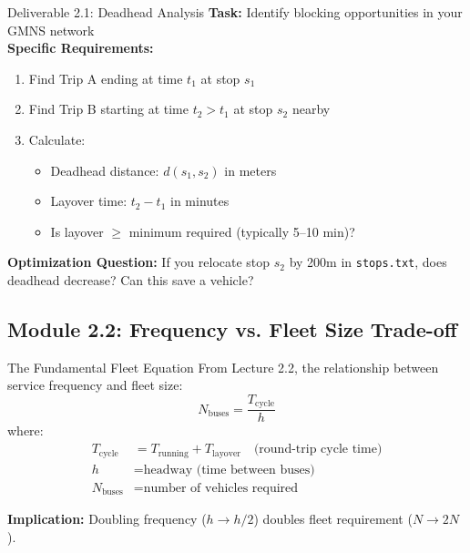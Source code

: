 \documentclass[11pt,letterpaper]{article}
\begin{document}
\begin{deliverablebox}{Deliverable 2.1: Deadhead Analysis}
\textbf{Task:} Identify blocking opportunities in your GMNS network\\[0.2cm]
\textbf{Specific Requirements:}
\begin{enumerate}[nosep]
    \item Find Trip A ending at time $t_1$ at stop $s_1$
    \item Find Trip B starting at time $t_2 > t_1$ at stop $s_2$ nearby
    \item Calculate:
    \begin{itemize}[nosep]
        \item Deadhead distance: $d(s_1, s_2)$ in meters
        \item Layover time: $t_2 - t_1$ in minutes
        \item Is layover $\geq$ minimum required (typically 5--10 min)?
    \end{itemize}
\end{enumerate}

\textbf{Optimization Question:} If you relocate stop $s_2$ by 200m in \texttt{stops.txt}, does deadhead decrease? Can this save a vehicle?
\end{deliverablebox}

\subsection{Module 2.2: Frequency vs. Fleet Size Trade-off}

\begin{conceptbox}{The Fundamental Fleet Equation}
From Lecture 2.2, the relationship between service frequency and fleet size:
\[
\boxed{N_{\text{buses}} = \frac{T_{\text{cycle}}}{h}}
\]
where:
\begin{align*}
T_{\text{cycle}} &= T_{\text{running}} + T_{\text{layover}} \quad \text{(round-trip cycle time)}\\
h &= \text{headway (time between buses)}\\
N_{\text{buses}} &= \text{number of vehicles required}
\end{align*}

\textbf{Implication:} Doubling frequency ($h \to h/2$) doubles fleet requirement ($N \to 2N$).
\end{conceptbox}
\end{document}
